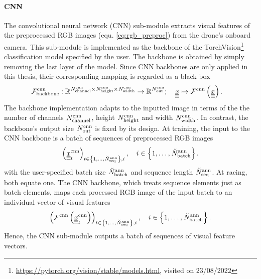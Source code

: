 \paragraph*{CNN} ${}$\\
The convolutional neural network (CNN) sub-module 
extracts visual features 
of the preprocessed RGB images 
(equ. \ref{eq:rgb_preproc})
from the drone's onboard camera.
This sub-module is implemented as the backbone
of the TorchVision\footnote{
    \url{https://pytorch.org/vision/stable/models.html}, visited on 23/08/2022
}
classification model specified by the user.
The backbone is obtained by simply removing the last layer of the model.
Since CNN backbones are only applied in this thesis, 
their corresponding mapping is 
regarded as a black box 
\begin{align} \label{eq:CNN}
    \mathcal{F}^\text{cnn}_{\text{backbone}}
    &:
    \mathbb{R}^{
        \num[]{\cnn}{\channel}{}{}
        \times
        \num[]{\cnn}{\height}{}{}
        \times
        \num[]{\cnn}{\widthh}{}{}
    } 
    \rightarrow 
    \mathbb{R}^{
        \num[]{\cnn}{\out}{}{}
    }
    ;\quad
    \img[]{}{}{}{}
    \mapsto 
    \mathcal{F}^\cnn \left(\img[]{}{}{}{}\right)
    .
\end{align}
The backbone implementation adapts to the inputted image
in terms of the 
the number of channels $\num[]{\cnn}{\channel}{}{}$,
height $\num[]{\cnn}{\height}{}{}$
and width $\num[]{\cnn}{\widthh}{}{}$.
In contrast, the backbone's output size $\num[]{\cnn}{\out}{}{}$
is fixed by its design.
At training, the input to the CNN backbone is
a batch of sequences of preprocessed RGB images
\begin{equation}
    \left(
        \img[]{\cnn}{t}{}{}
    \right)_{
        t \in \left\{1, \dots, \num[\user]{\ann}{\seq}{}{}\right\}
        , i
    }
    , \quad 
    i \in \left\{1, \dots, \num[\user]{\ann}{\batch}{}{}\right\}.
\end{equation}
with the user-specified
batch size $\num[\user]{\ann}{\batch}{}{}$
and sequence length $\num[\user]{\ann}{\seq}{}{}$.
At racing, both equate one.
The CNN backbone,
which treats sequence elements just as batch elements,
maps each processed RGB image of the input batch
to an individual vector of visual features
\begin{equation}
    \left(
        \mathcal{F}^\text{cnn} \left(
            \img[]{\cnn}{t}{}{}
        \right)
    \right)_{
        t \in \left\{1, \dots, \num[\user]{\ann}{\seq}{}{}\right\}
        , i
    }
    , \quad 
    i \in \left\{1, \dots, \num[\user]{\ann}{\batch}{}{}\right\}.
\end{equation}
Hence, the CNN sub-module 
outputs a batch of sequences of visual feature vectors.




